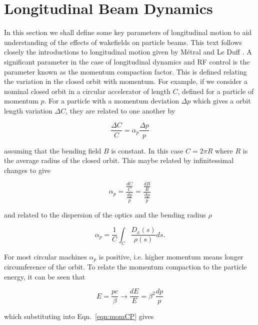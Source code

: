 \section{Longitudinal Beam Dynamics}
\label{app:long_motion}

In this section we shall define some key parameters of longitudinal motion to aid understanding of the effects of wakefields on particle beams. This text follows closely the introductions to longitudinal motion given by Métral \cite{Metral:LongDyn} and Le Duff \cite{Leduff:LongDyn}. A significant parameter in the case of longitudinal dynamics and RF control is the parameter known as the momentum compaction factor. This is defined relating the variation in the closed orbit with momentum. For example, if we consider a nominal closed orbit in a circular accelerator of length $C$, defined for a particle of momentum $p$. For a particle with a momentum deviation $\Delta p$ which gives a orbit length variation $\Delta C$, they are related to one another by

\begin{equation}
\frac{\Delta C}{C} = \alpha_{p} \frac{\Delta p}{p}
\end{equation}

assuming that the bending field $B$ is constant. In this case $C=2\pi R$ where $R$ is the average radius of the closed orbit. This maybe related by infinitessimal changes to give

\begin{equation}
\alpha_{p} = \frac{\frac{dC}{C}}{\frac{dp}{p}} = \frac{\frac{dR}{R}}{\frac{dp}{p}}
\label{eqn:momCP}
\end{equation}

and related to the dispersion of the optics and the bending radius $\rho$

\begin{equation}
\alpha_{p} = \frac{1}{C}\int_{C}\frac{D_{x} \left( s \right)}{\rho\left( s \right)} ds.
\end{equation}

For most circular machines $\alpha_{p}$ is positive, i.e. higher momentum means longer circumference of the orbit. To relate the momentum compaction to the particle energy, it can be seen that 

\begin{equation}
E = \frac{pc}{\beta} \rightarrow \frac{dE}{E} = \beta^{2}\frac{dp}{p}
\end{equation}

which substituting into Eqn.~\ref{eqn:momCP} gives


